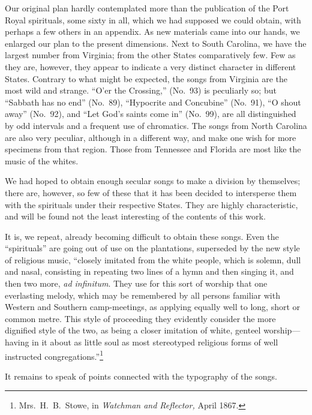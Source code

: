 \documentclass[a5paper,10pt]{book}
\begin{document}
Our original plan hardly contemplated more than the publication of the
Port Royal spirituals, some sixty in all, which we had supposed we
could obtain, with perhaps a few others in an appendix.  As new
materials came into our hands, we enlarged our plan to the present
dimensions.  Next to South Carolina, we have the largest number from
Virginia; from the other States comparatively few.  Few as they are,
however, they appear to indicate a very distinct character in
different States.  Contrary to what might be expected, the songs from
Virginia are the most wild and strange.  ``O'er the Crossing,''
(No.~93) is peculiarly so; but ``Sabbath has no end'' (No.~89),
``Hypocrite and Concubine'' (No.~91), ``O shout away'' (No.~92), and
``Let God's saints come in'' (No.~99), are all distinguished by odd
intervals and a frequent use of chromatics.  The songs from North
Carolina are also very peculiar, although in a different way, and make
one wish for more specimens from that region.  Those from Tennessee
and Florida are most like the music of the whites.

We had hoped to obtain enough secular songs to make a division by
themselves; there are, however, so few of these that it has been
decided to intersperse them with the spirituals under their respective
States.  They are highly characteristic, and will be found not the
least interesting of the contents of this work.

It is, we repeat, already becoming difficult to obtain these songs.
Even the ``spirituals'' are going out of use on the plantations,
superseded by the new style of religious music, ``closely imitated
from the white people, which is solemn, dull and nasal, consisting in
repeating two lines of a hymn and then singing it, and then two more,
\emph{ad infinitum}.  They use for this sort of worship that one
everlasting melody, which may be remembered by all persons familiar
with Western and Southern camp-meetings, as applying equally well to
long, short or common metre.  This style of proceeding they evidently
consider the more dignified style of the two, as being a closer
imitation of white, genteel worship---having in it about as little
soul as most stereotyped religious forms of well instructed
congregations.''\footnote{Mrs.~H.~B.~Stowe, in \emph{Watchman and
Reflector,} April 1867.}

It remains to speak of points connected with the typography of the
songs.
\end{document}
